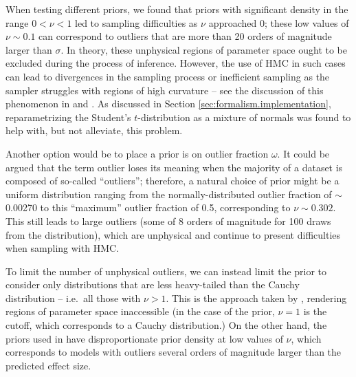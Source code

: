 \documentclass[fleqn,usenatbib]{rasti}
\begin{document}

When testing different priors, we found that priors with significant density in
the range $0 < \nu < 1$ led to sampling difficulties as $\nu$ approached 0;
these low values of $\nu \sim 0.1$ can correspond to outliers that are more than
20 orders of magnitude larger than $\sigma$. In theory, these unphysical regions
of parameter space ought to be excluded during the process of inference.
However, the use of HMC in such cases can lead to divergences in the sampling
process or inefficient sampling as the sampler struggles with regions of high
curvature -- see the discussion of this phenomenon in \citet{Neal:2003} and
\citet{Betancourt:2013}. As discussed in Section
\ref{sec:formalism.implementation}, reparametrizing the Student's
$t$-distribution as a mixture of normals was found to help with, but not
alleviate, this problem.

Another option would be to place a prior is on outlier fraction $\omega$. It
could be argued that the term outlier loses its meaning when the majority of a
dataset is composed of so-called ``outliers''; therefore, a natural choice of
prior might be a uniform distribution ranging from the normally-distributed
outlier fraction of $\sim$0.00270 to this ``maximum'' outlier fraction of 0.5,
corresponding to $\nu \sim 0.302$. This still leads to large outliers (some of 8
orders of magnitude for 100 draws from the distribution), which are unphysical
and continue to present difficulties when sampling with HMC.

To limit the number of unphysical outliers, we can instead limit the prior to
consider only distributions that are less heavy-tailed than the Cauchy
distribution -- i.e.\ all those with $\nu > 1$. This is the approach taken by
\citet{Gelman:2013}, rendering regions of parameter space inaccessible (in the
case of the \citet{Gelman:2013} prior, $\nu = 1$ is the cutoff, which
corresponds to a Cauchy distribution.) On the other hand, the priors used in
\citet{Juarez:2010, Ding:2014, Feeney:2018} have disproportionate prior density
at low values of $\nu$, which corresponds to models with outliers several orders
of magnitude larger than the predicted effect size.
\end{document}
